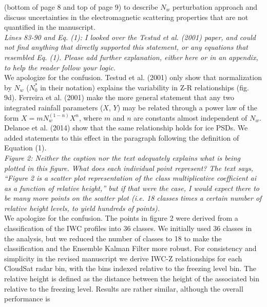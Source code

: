 \documentclass[12pt]{article}
\begin{document}
(bottom of page 8 and top of page 9) to describe $N_w$ perturbation approach and
discuss uncertainties in the electromagnetic scattering properties that are not quantified in the manuscript.\\ 
\newline
\textit{Lines 83-90 and Eq. (1): I looked over the Testud et al. (2001) paper, and could not find anything that directly
 supported this statement, or any equations that resembled Eq. (1). Please add further explanation, either here 
 or in an appendix, to help the reader follow your logic.}\\
\newline
We apologize for the confusion. Testud et al. (2001) only show that normalization by $N_w$ ($N_0^*$ in their notation) 
explains the variability
in Z-R relationships (fig. 9d). Ferreira et al. (2001) \cite{ferreira2001} make the more general statement that any two integrated rainfall parameters ($X$, $Y$) 
may be related through a power law of the form $X = m N_w^{(1-n)} X^n$, where $m$ and $n$ are constants almost independent of $N_w$. Delanoe et al. (2014)
 \cite{delanoe2014} show that the same relationship holds for ice PSDs. We added statements to this effect in the paragraph following
 the definition of Equation (1).\\
\newline
\textit{Figure 2: Neither the caption nor the text adequately explains what is being plotted in this figure. What does each 
individual point represent? The text says, “Figure 2 is a scatter plot representation of the class multiplicative 
coefficient ai as a function of relative height,” but if that were the case, I would expect there to be many more 
points on the scatter plot (i.e. 18 classes times a certain number of relative height levels, to yield hundreds of points).}\\
\newline
We apologize for the confusion.  The points in figure 2 were derived from a classification of the IWC profiles into 36 classes.  
We initially used 36 classes in the analysis, but
we reduced the number of classes to 18 to make the classification and the Ensemble Kalman Filter more robust.  
For consistency and simplicity in the revised manuscript we derive IWC-Z relationships 
for each CloudSat radar bin, with the bins indexed relative to the freezing level bin.  The relative height is defined as the distance
between the height of the associated bin relative to the freezing level.  Results are rather similar, although the overall performance is
\end{document}
